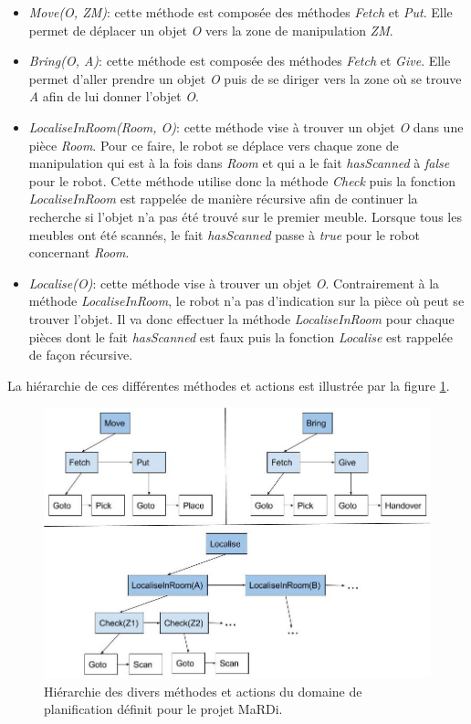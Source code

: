 \documentclass[a4paper,11pt,twoside]{StyleThese}
\begin{document}
\begin{itemize}

\item \textit{Move(O, ZM)}: cette méthode est composée des méthodes \textit{Fetch} et \textit{Put}. Elle permet de déplacer un objet \textit{O} vers la zone de manipulation \textit{ZM}.

\item \textit{Bring(O, A)}: cette méthode est composée des méthodes \textit{Fetch} et \textit{Give}. Elle permet d'aller prendre un objet \textit{O} puis de se diriger vers la zone où se trouve \textit{A} afin de lui donner l'objet \textit{O}.

\item \textit{LocaliseInRoom(Room, O)}: cette méthode vise à trouver un objet \textit{O} dans une pièce \textit{Room}. Pour ce faire, le robot se déplace vers chaque zone de manipulation qui est à la fois dans \textit{Room} et qui a le fait \textit{hasScanned} à \textit{false} pour le robot. Cette méthode utilise donc la méthode \textit{Check} puis la fonction \textit{LocaliseInRoom} est rappelée de manière récursive afin de continuer la recherche si l'objet n'a pas été trouvé sur le premier meuble.
Lorsque tous les meubles ont été scannés, le fait \textit{hasScanned} passe à \textit{true} pour le robot concernant \textit{Room}.

\item \textit{Localise(O)}: cette méthode vise à trouver un objet \textit{O}. Contrairement à la méthode \textit{LocaliseInRoom}, le robot n'a pas d'indication sur la pièce où peut se trouver l'objet. Il va donc effectuer la méthode \textit{LocaliseInRoom} pour chaque pièces dont le fait \textit{hasScanned} est faux puis la fonction \textit{Localise} est rappelée de façon récursive.
\end{itemize}

La hiérarchie de ces différentes méthodes et actions est illustrée par la figure \ref{fig:MardiDom}.


\begin{figure}[ht!]
 \centering
  \includegraphics[width=0.99\linewidth]{./img/mardiDom.jpg}
  \caption {Hiérarchie des divers méthodes et actions du domaine de planification définit pour le projet MaRDi.}
  \label{fig:MardiDom}
\end{figure}
\end{document}

